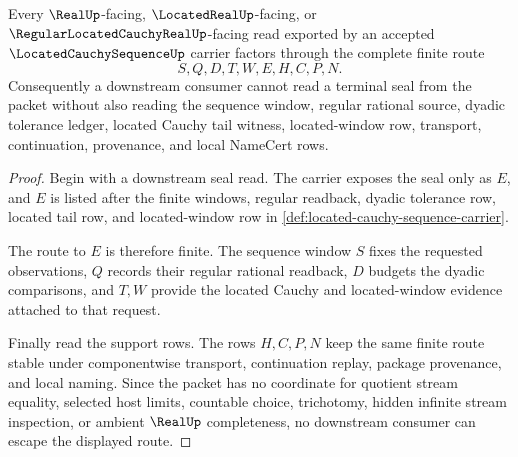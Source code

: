 \begin{theorem}\label{thm:located-cauchy-sequence-real-seal-nonescape}
Every $\RealUp$-facing, $\LocatedRealUp$-facing, or $\RegularLocatedCauchyRealUp$-facing read exported by an accepted $\LocatedCauchySequenceUp$ carrier factors through the complete finite route
$$
S,Q,D,T,W,E,H,C,P,N.
$$
Consequently a downstream consumer cannot read a terminal seal from the packet without also reading the sequence window, regular rational source, dyadic tolerance ledger, located Cauchy tail witness, located-window row, transport, continuation, provenance, and local NameCert rows.
\end{theorem}
\begin{proof}
Begin with a downstream seal read. The carrier exposes the seal only as $E$, and $E$ is listed after the finite windows, regular readback, dyadic tolerance row, located tail row, and located-window row in \autoref{def:located-cauchy-sequence-carrier}.

The route to $E$ is therefore finite. The sequence window $S$ fixes the requested observations, $Q$ records their regular rational readback, $D$ budgets the dyadic comparisons, and $T,W$ provide the located Cauchy and located-window evidence attached to that request.

Finally read the support rows. The rows $H,C,P,N$ keep the same finite route stable under componentwise transport, continuation replay, package provenance, and local naming. Since the packet has no coordinate for quotient stream equality, selected host limits, countable choice, trichotomy, hidden infinite stream inspection, or ambient $\RealUp$ completeness, no downstream consumer can escape the displayed route.
\end{proof}


\begin{closurestatus}{\LocatedCauchySequenceUp}
  \theoryclosure{\seedClosure}
  \formalstatus{\unformalizedV}
\end{closurestatus}
